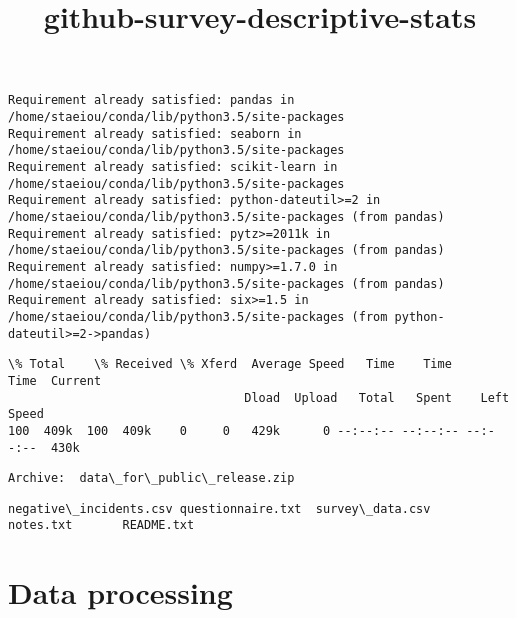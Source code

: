 \documentclass[11pt]{article}
\title{github-survey-descriptive-stats}
\begin{document}
    
    
    \maketitle
    
    

    
    


    \begin{Verbatim}[commandchars=\\\{\}]
Requirement already satisfied: pandas in /home/staeiou/conda/lib/python3.5/site-packages
Requirement already satisfied: seaborn in /home/staeiou/conda/lib/python3.5/site-packages
Requirement already satisfied: scikit-learn in /home/staeiou/conda/lib/python3.5/site-packages
Requirement already satisfied: python-dateutil>=2 in /home/staeiou/conda/lib/python3.5/site-packages (from pandas)
Requirement already satisfied: pytz>=2011k in /home/staeiou/conda/lib/python3.5/site-packages (from pandas)
Requirement already satisfied: numpy>=1.7.0 in /home/staeiou/conda/lib/python3.5/site-packages (from pandas)
Requirement already satisfied: six>=1.5 in /home/staeiou/conda/lib/python3.5/site-packages (from python-dateutil>=2->pandas)

    \end{Verbatim}



    \begin{Verbatim}[commandchars=\\\{\}]
  \% Total    \% Received \% Xferd  Average Speed   Time    Time     Time  Current
                                 Dload  Upload   Total   Spent    Left  Speed
100  409k  100  409k    0     0   429k      0 --:--:-- --:--:-- --:--:--  430k

    \end{Verbatim}


    \begin{Verbatim}[commandchars=\\\{\}]
Archive:  data\_for\_public\_release.zip

    \end{Verbatim}


    \begin{Verbatim}[commandchars=\\\{\}]
negative\_incidents.csv	questionnaire.txt  survey\_data.csv
notes.txt		README.txt

    \end{Verbatim}

    \section{Data processing}\label{data-processing}
\end{document}
